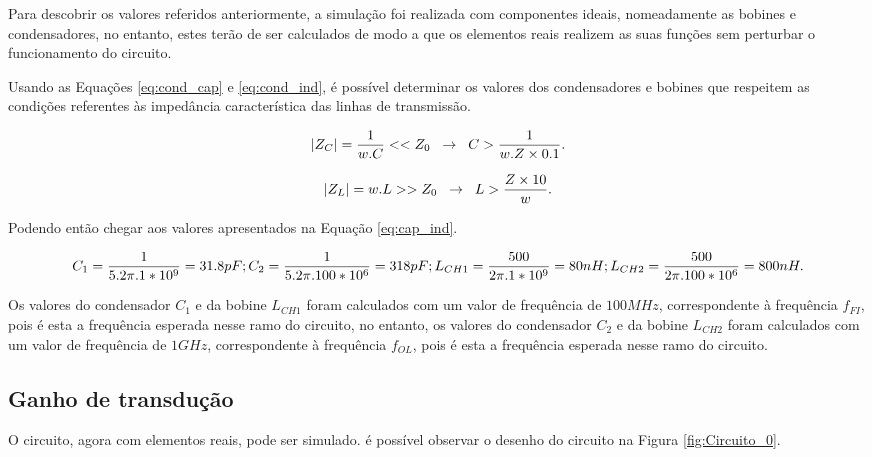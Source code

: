 \documentclass[11pt]{article}
\numberwithin{equation}{section}
\begin{document}
Para descobrir os valores referidos anteriormente, a simulação foi realizada com componentes ideais, nomeadamente as bobines e condensadores, no entanto, estes terão de ser calculados de modo a que os elementos reais realizem as suas funções sem perturbar o funcionamento do circuito.

Usando as Equações \ref{eq:cond_cap} e \ref{eq:cond_ind}, é possível determinar os valores dos condensadores e bobines que respeitem as condições referentes às impedância característica das linhas de transmissão.

\begin{equation}
\lvert Z_C \rvert = \frac{1}{w.C} << Z_0 \hspace{2mm} \rightarrow \hspace{2mm} C > \frac{1}{w.Z \times 0.1}.
\label{eq:cond_cap}
\end{equation}

\begin{equation}
\lvert Z_L \rvert = w.L >> Z_0 \hspace{2mm} \rightarrow \hspace{2mm} L > \frac{Z \times 10}{w}.
\label{eq:cond_ind}
\end{equation}

Podendo então chegar aos valores apresentados na Equação \ref{eq:cap_ind}.

\begin{equation}
\centering
C_{1}=\frac{1}{5.2\pi.1*10^{9}}=31.8pF; C_{2}=\frac{1}{5.2\pi.100*10^{6}}=318pF; L_{CH1}=\frac{500}{2\pi.1*10^{9}}=80nH; L_{CH2}=\frac{500}{2\pi.100*10^{6}}=800nH.
\label{eq:cap_ind}
\end{equation}

Os valores do condensador $ C_{1} $ e da bobine $ L_{CH1} $ foram calculados com um valor de frequência de $ 100MHz $, correspondente à frequência $ f_{FI} $, pois é esta a frequência esperada nesse ramo do circuito, no entanto, os valores do condensador $ C_{2} $ e da bobine $ L_{CH2} $ foram calculados com um valor de frequência de $ 1GHz $, correspondente à frequência $ f_{OL} $, pois é esta a frequência esperada nesse ramo do circuito.

\subsection{Ganho de transdução}

O circuito, agora com elementos reais, pode ser simulado. é possível observar o desenho do circuito na Figura \ref{fig:Circuito_0}.
\end{document}
